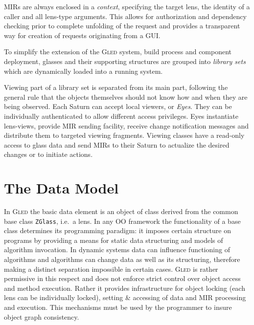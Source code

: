 \documentclass[a4paper,11pt]{article}
\def\gled{\textsc{Gled}\xspace}
\def\smalltt#1{{\small\texttt{#1}}}
\begin{document}
MIRs are always enclosed in a \emph{context}, specifying the target
lens, the identity of a caller and all lens-type arguments.
This allows for authorization and dependency checking prior to
complete unfolding of the request and provides a transparent
way for creation of requests originating from a GUI.

To simplify the extension of the \gled system, build process and
component deployment, glasses and their supporting structures are
grouped into \emph{library sets} which are dynamically loaded
into a running system.

Viewing part of a library set is separated from its main part,
following the general rule that the objects themselves should not know
how and when they are being observed. Each Saturn can accept local
viewers, or \emph{Eyes}. They can be individually authenticated to
allow different access privileges. Eyes instantiate lens-views,
provide MIR sending facility, receive change notification messages and
distribute them to targeted viewing fragments. Viewing classes have a
read-only access to glass data and send MIRs to their Saturn to
actualize the desired changes or to initiate actions.


\section{The Data Model}
\label{sec:DataModel}

In \gled the basic data element is an object of class derived from the
common base class \smalltt{ZGlass}, i.e.\ a lens. In any OO framework
the functionality of a base class determines its programming paradigm:
it imposes certain structure on programs by providing a means for
static data structuring and models of algorithm invocation. In dynamic
systems data can influence functioning of algorithms and algorithms
can change data as well as its structuring, therefore making a
distinct separation impossible in certain cases.  \gled is rather
permissive in this respect and does not enforce strict control over
object access and method execution. Rather it provides infrastructure
for object locking (each lens can be individually locked), setting \&
accessing of data and MIR processing and execution. This mechanisms
must be used by the programmer to insure object graph consistency.
\end{document}
